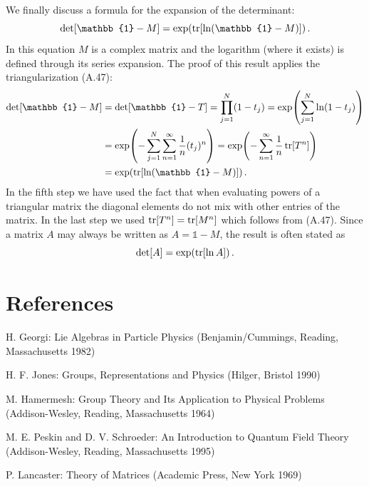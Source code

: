 We finally discuss a formula for the expansion of the determinant:
\begin{equation}
  \det[\mathbb{1} - M] = \exp\!\left(\tr[\ln(\mathbb{1} - M)]\right).
\end{equation}
In this equation $M$ is a complex matrix and the logarithm (where it exists)
is defined through its series expansion. The proof of this result applies the
triangularization (A.47):
\begin{align}
  \det[\mathbb{1} - M] &= \det[\mathbb{1} - T] = \prod_{j=1}^{N}(1 - t_j)
  = \exp\!\left(\sum_{j=1}^{N}\ln(1 - t_j)\right) \notag\\
  &= \exp\!\left(-\sum_{j=1}^{N}\sum_{n=1}^{\infty}\frac{1}{n}(t_j)^n\right)
  = \exp\!\left(-\sum_{n=1}^{\infty}\frac{1}{n}\tr[T^n]\right) \notag\\
  &= \exp\!\left(\tr[\ln(\mathbb{1} - M)]\right).
\end{align}
In the fifth step we have used the fact that when evaluating powers of a
triangular matrix the diagonal elements do not mix with other entries of the
matrix. In the last step we used $\operatorname{tr}[T^n] = \operatorname{tr}[M^n]$ which follows from
(A.47). Since a matrix $A$ may always be written as $A = \mathbb{1} - M$, the
result is often stated as
\begin{equation}
  \det[A] = \exp\!\left(\operatorname{tr}[\ln A]\right).
\end{equation}

\section*{References}

\begin{enumerate}[label={[\arabic*]}]
  \item H. Georgi: Lie Algebras in Particle Physics (Benjamin/Cummings,
    Reading, Massachusetts 1982)
  \item H. F. Jones: Groups, Representations and Physics (Hilger, Bristol 1990)
  \item M. Hamermesh: Group Theory and Its Application to Physical Problems
    (Addison-Wesley, Reading, Massachusetts 1964)
  \item M. E. Peskin and D. V. Schroeder: An Introduction to Quantum Field
    Theory (Addison-Wesley, Reading, Massachusetts 1995)
  \item P. Lancaster: Theory of Matrices (Academic Press, New York 1969)
\end{enumerate}
